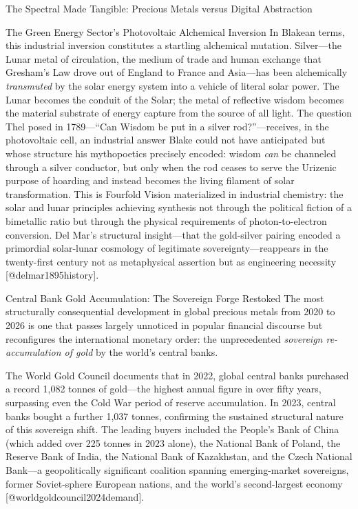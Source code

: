 \documentclass[
  ignorenonframetext,
]{beamer}
\begin{document}
\begin{frame}{The Spectral Made Tangible: Precious Metals versus Digital
Abstraction}
\begin{block}{The Green Energy Sector's Photovoltaic Alchemical
Inversion}
In Blakean terms, this industrial inversion constitutes a startling
alchemical mutation. Silver---the Lunar metal of circulation, the medium
of trade and human exchange that Gresham's Law drove out of England to
France and Asia---has been alchemically \emph{transmuted} by the solar
energy system into a vehicle of literal solar power. The Lunar becomes
the conduit of the Solar; the metal of reflective wisdom becomes the
material substrate of energy capture from the source of all light. The
question Thel posed in 1789---``Can Wisdom be put in a silver
rod?''---receives, in the photovoltaic cell, an industrial answer Blake
could not have anticipated but whose structure his mythopoetics
precisely encoded: wisdom \emph{can} be channeled through a silver
conductor, but only when the rod ceases to serve the Urizenic purpose of
hoarding and instead becomes the living filament of solar
transformation. This is Fourfold Vision materialized in industrial
chemistry: the solar and lunar principles achieving synthesis not
through the political fiction of a bimetallic ratio but through the
physical requirements of photon-to-electron conversion. Del Mar's
structural insight---that the gold-silver pairing encoded a primordial
solar-lunar cosmology of legitimate sovereignty---reappears in the
twenty-first century not as metaphysical assertion but as engineering
necessity {[}@delmar1895history{]}.
\end{block}

\begin{block}{Central Bank Gold Accumulation: The Sovereign Forge
Restoked}
\protect{}\label{central-bank-gold-accumulation-the-sovereign-forge-restoked}
The most structurally consequential development in global precious
metals from 2020 to 2026 is one that passes largely unnoticed in popular
financial discourse but reconfigures the international monetary order:
the unprecedented \emph{sovereign re-accumulation of gold} by the
world's central banks.

The World Gold Council documents that in 2022, global central banks
purchased a record 1,082 tonnes of gold---the highest annual figure in
over fifty years, surpassing even the Cold War period of reserve
accumulation. In 2023, central banks bought a further 1,037 tonnes,
confirming the sustained structural nature of this sovereign shift. The
leading buyers included the People's Bank of China (which added over 225
tonnes in 2023 alone), the National Bank of Poland, the Reserve Bank of
India, the National Bank of Kazakhstan, and the Czech National Bank---a
geopolitically significant coalition spanning emerging-market
sovereigns, former Soviet-sphere European nations, and the world's
second-largest economy {[}@worldgoldcouncil2024demand{]}.


\end{block}
\end{frame}
\end{document}
